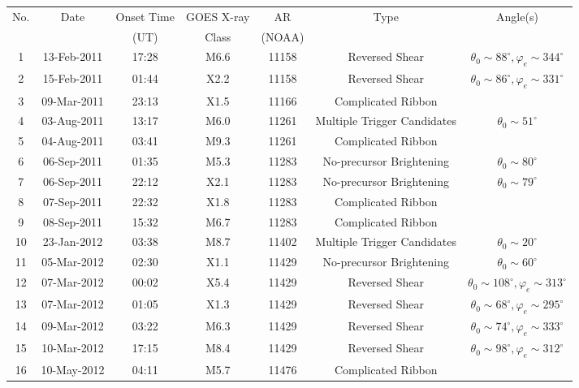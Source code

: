 \documentclass[10pt,preprint2]{aastex}
\begin{document}
\begin{table*}
\begin{center}
\begin{tabular}{|c||c|c|c|c|c|c|}
\hline
No. & Date & Onset Time & GOES X-ray & AR & Type & Angle(s) \\
 & & (UT) & Class & (NOAA) & & \\
\hline \hline
	1 & 13-Feb-2011 & 17:28 & M6.6 & 11158 & Reversed Shear & $\theta_{0}\sim88^{\circ}, \varphi_{e}\sim344^{\circ}$ \\ \hline
	2 & 15-Feb-2011 & 01:44 & X2.2 & 11158 & Reversed Shear & $\theta_{0}\sim86^{\circ}, \varphi_{e}\sim331^{\circ}$ \\ \hline
	3 & 09-Mar-2011 & 23:13 & X1.5 & 11166 & Complicated Ribbon & \\ \hline
	4 & 03-Aug-2011 & 13:17 & M6.0 & 11261 & Multiple Trigger Candidates & $\theta_{0}\sim51^{\circ}$ \\  \hline
	5 & 04-Aug-2011 & 03:41 & M9.3 & 11261 & Complicated Ribbon & \\ \hline
	6 & 06-Sep-2011 & 01:35 & M5.3 & 11283 & No-precursor Brightening & $\theta_{0}\sim80^{\circ}$ \\ \hline
	7 & 06-Sep-2011 & 22:12 & X2.1 & 11283 & No-precursor Brightening & $\theta_{0}\sim79^{\circ}$ \\ \hline
	8 & 07-Sep-2011 & 22:32 & X1.8 & 11283 & Complicated Ribbon & \\ \hline
	9 & 08-Sep-2011 & 15:32 & M6.7 & 11283 & Complicated Ribbon & \\ \hline
	10 & 23-Jan-2012 & 03:38 & M8.7 & 11402 & Multiple Trigger Candidates & $\theta_{0}\sim20^{\circ}$ \\ \hline
	11 & 05-Mar-2012 & 02:30 & X1.1 & 11429 & No-precursor Brightening & $\theta_{0}\sim60^{\circ}$ \\ \hline
	12 & 07-Mar-2012 & 00:02 & X5.4 & 11429 & Reversed Shear & $\theta_{0}\sim108^{\circ}, \varphi_{e}\sim313^{\circ}$ \\ \hline
	13 & 07-Mar-2012 & 01:05 & X1.3 & 11429 & Reversed Shear & $\theta_{0}\sim68^{\circ}, \varphi_{e}\sim295^{\circ}$ \\ \hline
	14 & 09-Mar-2012 & 03:22 & M6.3 & 11429 & Reversed Shear & $\theta_{0}\sim74^{\circ}, \varphi_{e}\sim333^{\circ}$ \\ \hline
	15 & 10-Mar-2012 & 17:15 & M8.4 & 11429 & Reversed Shear & $\theta_{0}\sim98^{\circ}, \varphi_{e}\sim312^{\circ}$ \\ \hline
	16 & 10-May-2012 & 04:11 & M5.7 & 11476 & Complicated Ribbon & \\ \hline

\end{tabular}
\end{center}
\end{table*}
\end{document}
